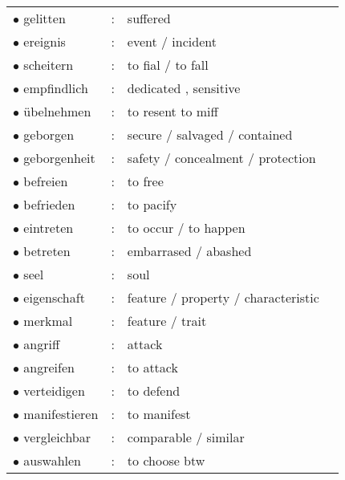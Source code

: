\documentclass[a4paper,twocolumn,10pt]{article}
\begin{document}
\begin{tabularx}{0.95\linewidth}{lllX}
\rowcolor{white} $\bullet$ gelitten        & : & suffered                            & \\
\rowcolor{white} $\bullet$ ereignis        & : & event / incident                    & \\
\rowcolor{white} $\bullet$ scheitern       & : & to fial / to fall                   & \\
\rowcolor{white} $\bullet$ empfindlich     & : & dedicated , sensitive               & \\
\rowcolor{white} $\bullet$ übelnehmen      & : & to resent to miff                   & \\
\rowcolor{white} $\bullet$ geborgen        & : & secure / salvaged / contained       & \\
\rowcolor{white} $\bullet$ geborgenheit    & : & safety / concealment / protection   & \\
\rowcolor{white} $\bullet$ befreien        & : & to free                             & \\
\rowcolor{white} $\bullet$ befrieden       & : & to pacify                           & \\
\rowcolor{white} $\bullet$ eintreten       & : & to occur / to happen                & \\
\rowcolor{white} $\bullet$ betreten        & : & embarrased / abashed                & \\
\rowcolor{white} $\bullet$ seel            & : & soul                                & \\
\rowcolor{white} $\bullet$ eigenschaft     & : & feature / property / characteristic & \\
\rowcolor{white} $\bullet$ merkmal         & : & feature / trait                     & \\
\rowcolor{white} $\bullet$ angriff         & : & attack                              & \\
\rowcolor{white} $\bullet$ angreifen       & : & to attack                           & \\
\rowcolor{white} $\bullet$ verteidigen     & : & to defend                           & \\
\rowcolor{white} $\bullet$ manifestieren   & : & to manifest                         & \\
\rowcolor{white} $\bullet$ vergleichbar    & : & comparable  / similar               & \\
\rowcolor{white} $\bullet$ auswahlen       & : & to choose btw                       & \\

\end{tabularx}
\end{document}
